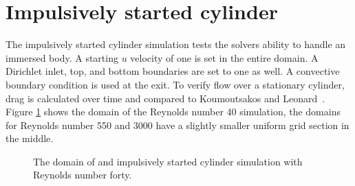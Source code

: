 \documentclass[onehalf,11pt]{beavtex}
\begin{document}
\section{Impulsively started cylinder}
The impulsively started cylinder simulation tests the solvers ability to handle an immersed body.
A starting $u$ velocity of one is set in the entire domain.
A Dirichlet inlet, top, and bottom boundaries are set to one as well.
A convective boundary condition is used at the exit.
To verify flow over a stationary cylinder, drag is calculated over time and compared to Koumoutsakos and Leonard~\cite{Koumoutsakos:1995bf}.
Figure \ref{fig:iscylinder} shows the domain of the Reynolds number 40 simulation, the domains for Reynolds number 550 and 3000 have a slightly smaller uniform grid section in the middle.
\begin{figure}[h]
	\centering
	
	\label{fig:iscylinder}
	\caption{The domain of and impulsively started cylinder simulation with Reynolds number forty.}
\end{figure}
\end{document}
